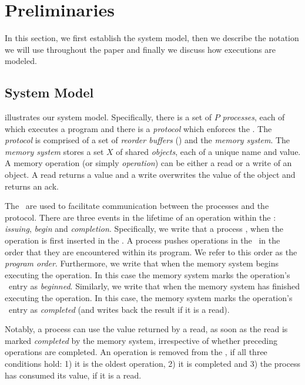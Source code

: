 \section{Preliminaries}


In this section, we first establish the system model, then we describe the notation we will use throughout the paper and finally we discuss how executions are modeled. %

\subsection{System Model} \label{sec:sysmod}
 illustrates our system model.
Specifically, there is a set of $P$ \emph{processes}, each of which executes a program and there is a \emph{protocol} which enforces the \mcm. %
The \emph{protocol} is comprised of a set of \emph{reorder buffers} (\robs) and the \emph{memory system}.
The \emph{memory system} stores a set $X$ of shared \emph{objects}, each of a unique name and value.
A memory operation (or simply \emph{operation}) can be either a read or a write of an object. A read returns a value and a write overwrites the value of the object and returns an ack.

\beginbsec{\robs}
 The \robs\ are used to facilitate communication between the processes  and the protocol. %
There are three events in the lifetime of an operation within the \rob: \emph{issuing},  \emph{begin} and \emph{completion}. Specifically, 
we write that a process , when the operation is first inserted in the \rob. A process pushes operations in the \rob\ in the order that they are encountered within its program. 
We refer to this order as the \emph{program order}.
Furthermore, we write that  when the memory system begins executing the operation. In this case the memory system marks the operation's \rob\ entry as \emph{beginned}. 
Similarly, we write that  when the memory system has finished executing the operation. In this case, the memory system marks the operation's \rob\ entry as \emph{completed} (and writes back the result if it is a read).

Notably, a process can use the value returned by a read, as soon as the read is marked \emph{completed} by the memory system, irrespective of whether preceding operations are completed.
An operation is removed from the \rob, if all three conditions hold: 1) it is the oldest operation, 2) it is completed and 3) the process has consumed its value, if it is a read.

